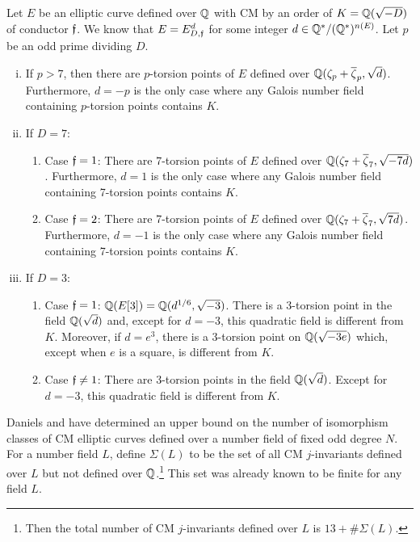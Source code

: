 \begin{thm}
Let $E$ be an elliptic curve defined over $\mathbb{Q}$ with CM by an order of $K= \mathbb{Q}(\sqrt{-D})$ of conductor $\mathfrak{f}$. We know that $E= E_{D,\mathfrak{f}}^d$ for some integer $d \in \mathbb{Q}^*/(\mathbb{Q}^*)^{n(E)}$. Let $p$ be an odd prime dividing $D$. 
	\begin{enumerate}[(i)]
	\item If $p > 7$, then there are $p$-torsion points of $E$ defined over $\mathbb{Q}(\zeta_p + \overline{\zeta}_p, \sqrt{d})$. Furthermore, $d= -p$ is the only case where any Galois number field containing $p$-torsion points contains $K$.
	\item If $D= 7$:
		\begin{enumerate}[--]
		\item Case $\mathfrak{f}= 1$: There are 7-torsion points of $E$ defined over $\mathbb{Q}(\zeta_7 + \overline{\zeta}_7, \sqrt{-7d})$. Furthermore, $d= 1$ is the only case where any Galois number field containing 7-torsion points contains $K$.
		\item Case $\mathfrak{f}= 2$: There are 7-torsion points of $E$ defined over $\mathbb{Q}(\zeta_7 + \overline{\zeta}_7, \sqrt{7d})$. Furthermore, $d= -1$ is the only case where any Galois number field containing 7-torsion points contains $K$.
		\end{enumerate}
	\item If $D= 3$:
		\begin{enumerate}[--]
		\item Case $\mathfrak{f}= 1$: $\mathbb{Q}(E[3])= \mathbb{Q}(d^{1/6}, \sqrt{-3})$. There is a 3-torsion point in the field $\mathbb{Q}(\sqrt{d})$ and, except for $d= -3$, this quadratic field is different from $K$. Moreover, if $d= e^3$, there is a 3-torsion point on $\mathbb{Q}(\sqrt{-3e})$ which, except when $e$ is a square, is different from $K$.
		\item Case $\mathfrak{f} \neq 1$: There are 3-torsion points in the field $\mathbb{Q}(\sqrt{d})$. Except for $d= -3$, this quadratic field is different from $K$. 
		\end{enumerate}
	\end{enumerate}
\end{thm}


Daniels and \lozrob{} have determined an upper bound on the number of isomorphism classes of CM elliptic curves defined over a number field of fixed odd degree $N$. For a number field $L$, define $\Sigma(L)$ to be the set of all CM $j$-invariants defined over $L$ but not defined over $\mathbb{Q}$.\footnote{Then the total number of CM $j$-invariants defined over $L$ is $13 + \#\Sigma(L)$.} This set was already known to be finite for any field $L$. 


